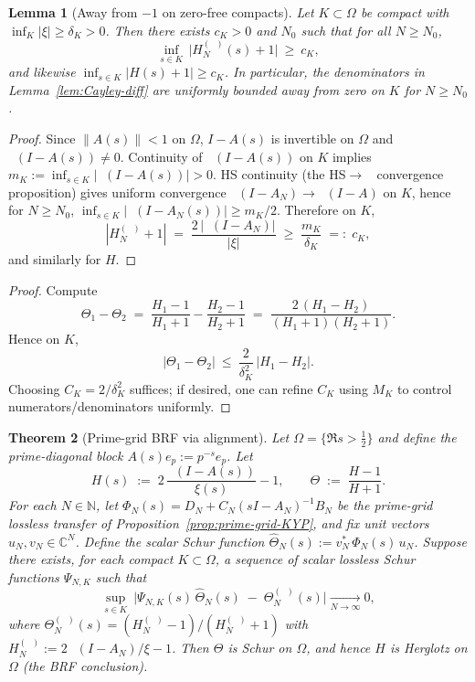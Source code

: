 \documentclass[11pt]{article}
\newtheorem{theorem}{Theorem}
\newtheorem{lemma}[theorem]{Lemma}
\theoremstyle{definition}
\theoremstyle{remark}
\newcommand{\C}{\mathbb{C}}
\newcommand{\N}{\mathbb{N}}
\DeclareMathOperator{\dettwo}{det_2}
\begin{document}
\begin{lemma}[Away from \(-1\) on zero-free compacts]\label{lem:away-minus-one}
Let \(K\subset\Omega\) be compact with \(\inf_{K}|\xi|\ge \delta_K>0\). Then there exists \(c_K>0\) and \(N_0\) such that for all \(N\ge N_0\),
\[
 \inf_{s\in K}\,\bigl| H_N^{(\dettwo)}(s)+1\bigr|\ \ge\ c_K,
\]
and likewise \(\inf_{s\in K}|H(s)+1|\ge c_K\). In particular, the denominators in Lemma~\ref{lem:Cayley-diff} are uniformly bounded away from zero on \(K\) for \(N\ge N_0\).
\end{lemma}
\begin{proof}
Since \(\|A(s)\|<1\) on \(\Omega\), \(I-A(s)\) is invertible on \(\Omega\) and \(\dettwo(I-A(s))\ne 0\). Continuity of \(\dettwo(I-A(s))\) on \(K\) implies \(m_K:=\inf_{s\in K}|\dettwo(I-A(s))|>0\). HS continuity (the HS\(\to\)\(\dettwo\) convergence proposition) gives uniform convergence \(\dettwo(I-A_N)\to \dettwo(I-A)\) on \(K\), hence for \(N\ge N_0\), \(\inf_{s\in K}|\dettwo(I-A_N(s))|\ge m_K/2\). Therefore on \(K\),
\[
 |H_N^{(\dettwo)}+1|\;=\;\frac{2\,|\dettwo(I-A_N)|}{|\xi|}\;\ge\;\frac{m_K}{\delta_K}\;=:\;c_K,
\]
and similarly for \(H\).
\end{proof}
\begin{proof}
Compute
\[
 \Theta_1-\Theta_2\;=\;\frac{H_1-1}{H_1+1}-\frac{H_2-1}{H_2+1}
 \;=\;\frac{2\,(H_1-H_2)}{(H_1+1)(H_2+1)}.
\]
Hence on \(K\),
\[
 |\Theta_1-\Theta_2|\ \le\ \frac{2}{\delta_K^2}\,|H_1-H_2|.
\]
Choosing \(C_K=2/\delta_K^2\) suffices; if desired, one can refine \(C_K\) using \(M_K\) to control numerators/denominators uniformly.
\end{proof}
\begin{theorem}[Prime-grid BRF via alignment]\label{thm:prime-grid-BRF}
Let \(\Omega=\{\Re s>\tfrac12\}\) and define the prime-diagonal block \(A(s)e_p:=p^{-s}e_p\). Let
\[
 H(s)\;:=\;2\,\frac{\dettwo(I-A(s))}{\xi(s)}-1,\qquad \Theta\;:=\;\frac{H-1}{H+1}.
\]
For each \(N\in\N\), let \(\Phi_N(s)=D_N+C_N(sI-A_N)^{-1}B_N\) be the prime-grid lossless transfer of Proposition~\ref{prop:prime-grid-KYP}, and fix unit vectors \(u_N,v_N\in\C^N\). Define the scalar Schur function \(\widehat\Theta_N(s):=v_N^*\,\Phi_N(s)\,u_N\). Suppose there exists, for each compact \(K\subset\Omega\), a sequence of scalar lossless Schur functions \(\Psi_{N,K}\) such that
\begin{equation}\label{eq:uniform-alignment}
 \sup_{s\in K}\ \big|\Psi_{N,K}(s)\,\widehat\Theta_N(s)\; -\; \Theta_N^{(\dettwo)}(s)\big|\xrightarrow[N\to\infty]{}0,
\end{equation}
where \(\Theta_N^{(\dettwo)}(s)=(H_N^{(\dettwo)}-1)/(H_N^{(\dettwo)}+1)\) with \(H_N^{(\dettwo)}:=2\,\dettwo(I-A_N)/\xi-1\). Then \(\Theta\) is Schur on \(\Omega\), and hence \(H\) is Herglotz on \(\Omega\) (the BRF conclusion).
\end{theorem}
\end{document}
